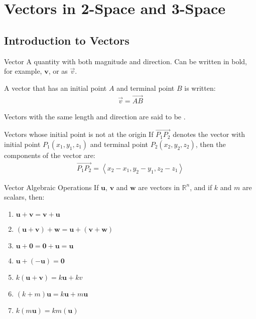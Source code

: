 \documentclass[\main/notes.tex]{subfiles}
\begin{document}
	\setcounter{chapter}{2}
	\chapter{Vectors in 2-Space and 3-Space}
		\section{Introduction to Vectors}
			\begin{definition}{Vector}
				A quantity with both magnitude and direction. Can be written in bold, for example, $\mathbf{v}$, or as $\overrightarrow{v}$.

				A vector that has an initial point $A$ and terminal point $B$ is written:
				\begin{align*}
					\overrightarrow{v} = \overrightarrow{AB}
				\end{align*}

				Vectors with the same length and direction are said to be .
			\end{definition}
			\begin{sidenote}{Vectors whose initial point is not at the origin}
				If $\overrightarrow{P_{1}P_{2}}$ denotes the vector with initial point $P_{1}(x_{1}, y_{1}, z_{1})$ and terminal point $P_{2}(x_{2}, y_{2}, z_{2})$, then the components of the vector are:
				\begin{align*}
					\overrightarrow{P_{1}P_{2}} = \left\langle x_{2} - x_{1}, y_{2} - y_{1}, z_{2} - z_{1}\right\rangle
				\end{align*}
			\end{sidenote}
			\begin{sidenote}{Vector Algebraic Operations}
				If $\mathbf{u}$, $\mathbf{v}$ and $\mathbf{w}$ are vectors in $\mathbb{R}^{n}$, and if $k$ and $m$ are scalars, then:
				\begin{enumerate}[label=(\alph*)]
					\item $\mathbf{u} + \mathbf{v} = \mathbf{v} + \mathbf{u}$
					\item $(\mathbf{u} + \mathbf{v}) + \mathbf{w} = \mathbf{u} + (\mathbf{v} + \mathbf{w})$
					\item $\mathbf{u} + \mathbf{0} = \mathbf{0} + \mathbf{u} = \mathbf{u}$
					\item $\mathbf{u} + (-\mathbf{u}) = \mathbf{0}$
					\item $k(\mathbf{u} + \mathbf{v}) = k\mathbf{u} + kv$
					\item $(k + m)\mathbf{u} = k\mathbf{u} + m\mathbf{u}$
					\item $k(m\mathbf{u}) = km(\mathbf{u})$
				\end{enumerate}
			\end{sidenote}
\end{document}
